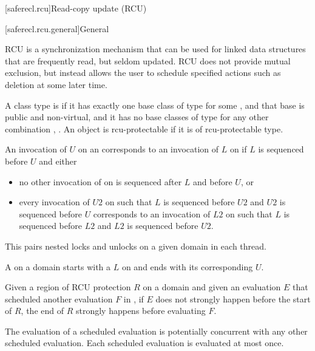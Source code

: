 
[saferecl.rcu]{Read-copy update (RCU)}

[saferecl.rcu.general]{General}

\pnum
RCU is a synchronization mechanism that can be used for linked data
structures that are frequently read, but seldom updated. RCU does
not provide mutual exclusion, but instead allows the user to schedule
specified actions such as deletion at some later time.

\pnum
A class type  is  if it has exactly one
base class of type  for some , and
that base is public and non-virtual,
and it has no base classes of type  for any other
combination , . An object is rcu-protectable if it is
of rcu-protectable type.

\pnum
An invocation of  $U$ on an  corresponds
to an invocation of  $L$ on  if $L$ is
sequenced before $U$ and either

\begin{itemize}
\item	no other invocation of  on  is sequenced
	after $L$ and before $U$, or
\item	every invocation of  $U2$ on  such
	that $L$ is sequenced before $U2$ and $U2$
	is sequenced before $U$ corresponds to an invocation of
	 $L2$ on  such that $L$ is sequenced
	before $L2$ and $L2$ is sequenced before $U2$.
\end{itemize}
\begin{note}
This pairs nested locks and unlocks on a given domain in each thread.
\end{note}

\pnum
A  on a domain  starts
with a  $L$ on  and ends with its corresponding
 $U$.

\pnum
Given a region of RCU protection $R$ on a domain 
and given an evaluation $E$ that scheduled another evaluation
$F$ in , if $E$ does not strongly happen before
the start of $R$, the end of $R$ strongly happens before
evaluating $F$.

\pnum
The evaluation of a scheduled evaluation is potentially concurrent with
any other scheduled evaluation. Each scheduled evaluation is evaluated at
most once.

